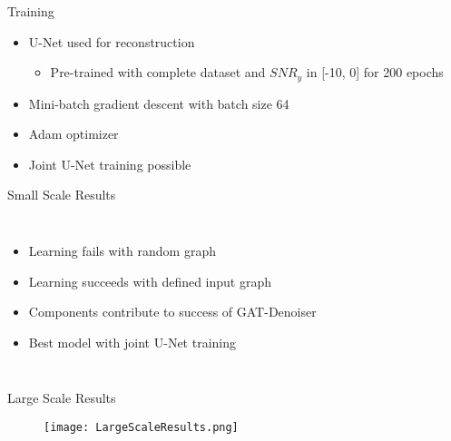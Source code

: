 \begin{frame}{Training}
    \begin{itemize}
        \item U-Net used for reconstruction
        \begin{itemize}
            \item Pre-trained with complete dataset and $SNR_y$ in [-10, 0] for 200 epochs
        \end{itemize}
        \item Mini-batch gradient descent with batch size 64
        \item Adam optimizer
        \item Joint U-Net training possible
    \end{itemize}
\end{frame}

\begin{frame}{Small Scale Results}
    \begin{columns}
        \begin{itemize}
            \item Learning fails with random graph
            \item Learning succeeds with defined input graph
            \item Components contribute to success of GAT-Denoiser
            \item Best model with joint U-Net training 
        \end{itemize}
        
    \end{columns}
\end{frame}

\begin{frame}{Large Scale Results}
    \begin{figure}
        \centering
        \texttt{[image: LargeScaleResults.png]}
    \end{figure}
\end{frame}

